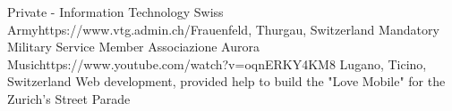 \begin{CV}
        {Private - Information Technology}
        {Swiss Army}{https://www.vtg.admin.ch/}{Frauenfeld, Thurgau, Switzerland}
        {Mandatory Military Service}
        {Member}
        {Associazione Aurora Music}{https://www.youtube.com/watch?v=oqnERKY4KM8}
        {Lugano, Ticino, Switzerland}
        {Web development, provided help to build the "Love Mobile" for the Zurich's 
        Street Parade}
\end{CV}